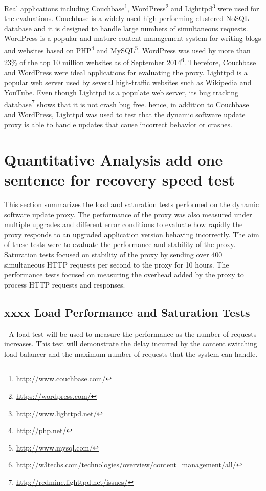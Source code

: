 \documentclass[a4paper,11pt,twoside]{report}
\begin{document}
Real applications including Couchbase\footnote{\label{couchbase} \url{http://www.couchbase.com/}}, WordPress\footnote{\label{wordpress} \url{https://wordpress.com/}} and Lighttpd\footnote{\label{lighttpd}\url{http://www.lighttpd.net/}} were used for the evaluations. Couchbase is a widely used high performing clustered NoSQL database and it is designed to handle large numbers of  simultaneous requests. WordPress is a popular and mature content management system for writing blogs and websites based on PHP\footnote{\label{PHP}\url{http://php.net/}} and MySQL\footnote{\label{MySQL}\url{http://www.mysql.com/}}. WordPress was used by more than 23\% of the top 10 million websites as of September 2014\footnote{\label{w3techs}\url{http://w3techs.com/technologies/overview/content_management/all/}}. Therefore, Couchbase and WordPress were ideal applications for evaluating the proxy. Lighttpd is a popular web server used by several high-traffic websites such as Wikipedia and YouTube. Even though Lighttpd is a populate web server, its bug tracking database\footnote{\label{redmine}\url{http://redmine.lighttpd.net/issues/}} shows that it is not crash bug free. hence, in addition to Couchbase and WordPress,  Lighttpd was used to test that the dynamic software update proxy is able to handle updates that cause incorrect behavior or crashes.     

\section{Quantitative Analysis add one sentence for recovery speed test}\label{Quantitative_Analysis}
This section summarizes the load and saturation tests performed on the dynamic software update proxy. The performance of the proxy was also measured under multiple upgrades and different error conditions to evaluate how rapidly the proxy responds to an upgraded application version behaving incorrectly. The aim of these tests were to evaluate the performance and stability of the proxy. Saturation tests focused on stability of the proxy by sending over 400 simultaneous HTTP requests per second to the proxy for 10 hours. The performance tests focused on measuring the overhead added by the proxy to process HTTP requests and responses.



\subsection{xxxx Load Performance and Saturation Tests}\label{load} - A load test will be used to measure the performance as the number of requests increases. This test will demonstrate the delay incurred by the content switching load balancer and the maximum number of requests that the system can handle.
\end{document}
